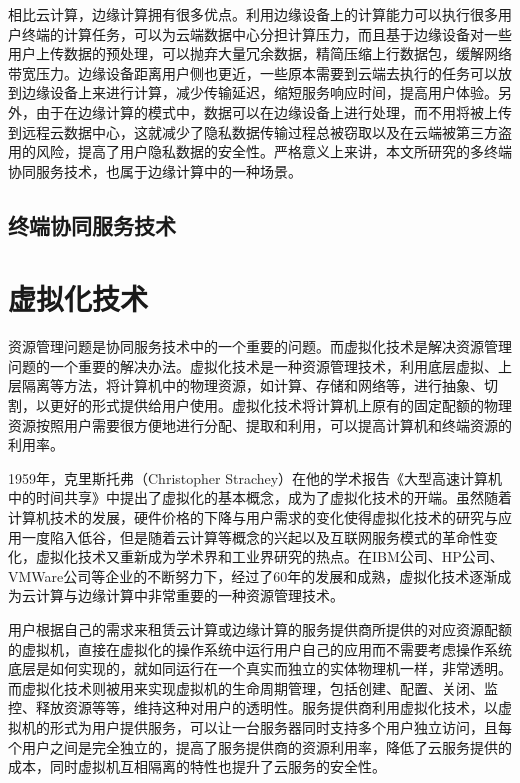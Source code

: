 相比云计算，边缘计算拥有很多优点\cite{赵梓铭2018边缘计算}。利用边缘设备上的计算能力可以执行很多用户终端的计算任务，可以为云端数据中心分担计算压力，而且基于边缘设备对一些用户上传数据的预处理，可以抛弃大量冗余数据，精简压缩上行数据包，缓解网络带宽压力。边缘设备距离用户侧也更近，一些原本需要到云端去执行的任务可以放到边缘设备上来进行计算，减少传输延迟，缩短服务响应时间，提高用户体验。另外，由于在边缘计算的模式中，数据可以在边缘设备上进行处理，而不用将被上传到远程云数据中心，这就减少了隐私数据传输过程总被窃取以及在云端被第三方盗用的风险，提高了用户隐私数据的安全性。严格意义上来讲，本文所研究的多终端协同服务技术，也属于边缘计算中的一种场景。

\subsection{终端协同服务技术}


\section{虚拟化技术}\label{sec:related_work_virtualization}
资源管理问题是协同服务技术中的一个重要的问题\citep{文雨2013面向应用服务级目标的虚拟化资源管理}。而虚拟化技术是解决资源管理问题的一个重要的解决办法。虚拟化技术是一种资源管理技术，利用底层虚拟、上层隔离等方法，将计算机中的物理资源，如计算、存储和网络等，进行抽象、切割，以更好的形式提供给用户使用\cite{goth2007virtualization}。虚拟化技术将计算机上原有的固定配额的物理资源按照用户需要很方便地进行分配、提取和利用，可以提高计算机和终端资源的利用率。

1959年，克里斯托弗（Christopher Strachey）在他的学术报告《大型高速计算机中的时间共享》中提出了虚拟化的基本概念，成为了虚拟化技术的开端\citep{本刊编辑部2017虚拟化概述}。虽然随着计算机技术的发展，硬件价格的下降与用户需求的变化使得虚拟化技术的研究与应用一度陷入低谷，但是随着云计算等概念的兴起以及互联网服务模式的革命性变化，虚拟化技术又重新成为学术界和工业界研究的热点\cite{menasce2005virtualization}。在IBM公司、HP公司、VMWare公司等企业的不断努力下，经过了60年的发展和成熟，虚拟化技术逐渐成为云计算与边缘计算中非常重要的一种资源管理技术\cite{pearce2013virtualization,kumar2014review}。

用户根据自己的需求来租赁云计算或边缘计算的服务提供商所提供的对应资源配额的虚拟机，直接在虚拟化的操作系统中运行用户自己的应用而不需要考虑操作系统底层是如何实现的，就如同运行在一个真实而独立的实体物理机一样，非常透明\cite{叶蔚2019基于虚拟化的}。而虚拟化技术则被用来实现虚拟机的生命周期管理，包括创建、配置、关闭、监控、释放资源等等，维持这种对用户的透明性。服务提供商利用虚拟化技术，以虚拟机的形式为用户提供服务，可以让一台服务器同时支持多个用户独立访问，且每个用户之间是完全独立的，提高了服务提供商的资源利用率，降低了云服务提供的成本，同时虚拟机互相隔离的特性也提升了云服务的安全性。

